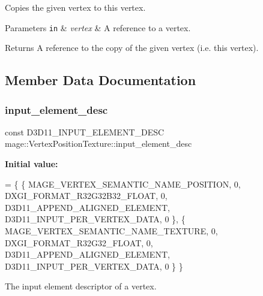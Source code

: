 Copies the given vertex to this vertex.


\begin{DoxyParams}[1]{Parameters}
\mbox{\tt in}  & {\em vertex} & A reference to a vertex. \\
\hline
\end{DoxyParams}
\begin{DoxyReturn}{Returns}
A reference to the copy of the given vertex (i.\+e. this vertex). 
\end{DoxyReturn}


\subsection{Member Data Documentation}
\hypertarget{structmage_1_1_vertex_position_texture_afbe5de758f42c05cdb10c493f90b6fca}{}\label{structmage_1_1_vertex_position_texture_afbe5de758f42c05cdb10c493f90b6fca} 
\subsubsection{\texorpdfstring{input\+\_\+element\+\_\+desc}{input\_element\_desc}}
{\footnotesize\ttfamily const D3\+D11\+\_\+\+I\+N\+P\+U\+T\+\_\+\+E\+L\+E\+M\+E\+N\+T\+\_\+\+D\+E\+SC mage\+::\+Vertex\+Position\+Texture\+::input\+\_\+element\+\_\+desc\hspace{0.3cm}{\ttfamily [static]}}

{\bfseries Initial value\+:}
\begin{DoxyCode}
= \{
        \{ MAGE\_VERTEX\_SEMANTIC\_NAME\_POSITION, 0, DXGI\_FORMAT\_R32G32B32\_FLOAT,    0, 
      D3D11\_APPEND\_ALIGNED\_ELEMENT, D3D11\_INPUT\_PER\_VERTEX\_DATA, 0 \},
        \{ MAGE\_VERTEX\_SEMANTIC\_NAME\_TEXTURE,  0, DXGI\_FORMAT\_R32G32\_FLOAT,       0, 
      D3D11\_APPEND\_ALIGNED\_ELEMENT, D3D11\_INPUT\_PER\_VERTEX\_DATA, 0 \}
    \}
\end{DoxyCode}
The input element descriptor of a vertex. \hypertarget{structmage_1_1_vertex_position_texture_a1ef796b1dfad7a11d03120cb65a8cdb4}{}\label{structmage_1_1_vertex_position_texture_a1ef796b1dfad7a11d03120cb65a8cdb4} 
